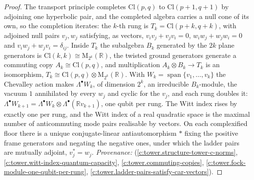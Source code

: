 \documentclass[11pt]{article}
\theoremstyle{definition}
\theoremstyle{plain}
\providecommand{\Cl}{}\renewcommand{\Cl}{\mathrm{Cl}}
\providecommand{\R}{}\renewcommand{\R}{\mathbb{R}}
\begin{document}
\begin{proof}
The transport principle completes $\Cl(p,q)$ to $\Cl(p{+}1,q{+}1)$ by adjoining one hyperbolic pair, and the completed algebra carries a null cone of its own, so the completion iterates: the $k$-th rung is $T_{k} = \Cl(p{+}k, q{+}k)$, with adjoined null pairs $v_{j}, w_{j}$ satisfying, as vectors, $v_{i}v_{j} + v_{j}v_{i} = 0$, $w_{i}w_{j} + w_{j}w_{i} = 0$ and $v_{i}w_{j} + w_{j}v_{i} = \delta_{ij}$. Inside $T_{k}$ the subalgebra $B_{k}$ generated by the $2k$ plane generators is $\Cl(k,k) \cong \mathrm{M}_{2^{k}}(\R)$, the twisted ground generators generate a commuting copy $A_{k} \cong \Cl(p,q)$, and multiplication $A_{k} \otimes B_{k} \to T_{k}$ is an isomorphism, $T_{k} \cong \Cl(p,q) \otimes \mathrm{M}_{2^{k}}(\R)$. With $W_{k} = \operatorname{span}\{v_{1}, \ldots, v_{k}\}$ the Chevalley action makes $\Lambda^{\bullet}W_{k}$, of dimension $2^{k}$, an irreducible $B_{k}$-module, the vacuum $1$ annihilated by every $w_{j}$ and cyclic for the $v_{j}$, and each rung doubles it: $\Lambda^{\bullet}W_{k+1} = \Lambda^{\bullet}W_{k} \otimes \Lambda^{\bullet}(\R v_{k+1})$, one qubit per rung. The Witt index rises by exactly one per rung, and the Witt index of a real quadratic space is the maximal number of anticommuting mode pairs realisable by vectors. On each complexified floor there is a unique conjugate-linear antiautomorphism $*$ fixing the positive frame generators and negating the negative ones, under which the ladder pairs are mutually adjoint, $v_{j}^{*} = w_{j}$. \emph{Provenance:} \cite[Def.~2.2, Thm.~3.2, Prop.~4.1, Thms.~4.2, 4.3, Lem.~5.4]{ButlerT3} (\ref{c:tower.structure-tower-c-norms}, \ref{c:tower.witt-index-quantum-capacity}, \ref{c:tower.commuting-copies}, \ref{c:tower.fock-module-one-qubit-per-rung}, \ref{c:tower.ladder-pairs-satisfy-car-vectors}).

\end{proof}
\end{document}
